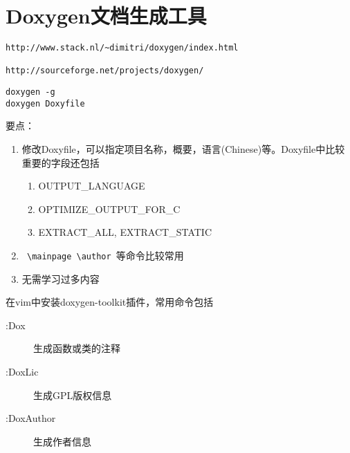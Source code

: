 \section{Doxygen文档生成工具}
\begin{verbatim}
http://www.stack.nl/~dimitri/doxygen/index.html

http://sourceforge.net/projects/doxygen/
\end{verbatim}

\begin{lstlisting}
doxygen -g
doxygen Doxyfile
\end{lstlisting}

要点：
\begin{enumerate}
	\item 修改Doxyfile，可以指定项目名称，概要，语言(Chinese)等。Doxyfile中比较重要的字段还包括
	\begin{enumerate}
		\item OUTPUT\_LANGUAGE
		\item OPTIMIZE\_OUTPUT\_FOR\_C
		\item EXTRACT\_ALL, EXTRACT\_STATIC
	\end{enumerate}
	\item \verb+ \mainpage \author +等命令比较常用
	\item 无需学习过多内容
\end{enumerate}

在vim中安装doxygen-toolkit插件，常用命令包括
\begin{description}
    \item[:Dox]生成函数或类的注释
    \item[:DoxLic]生成GPL版权信息
    \item[:DoxAuthor]生成作者信息
\end{description}


